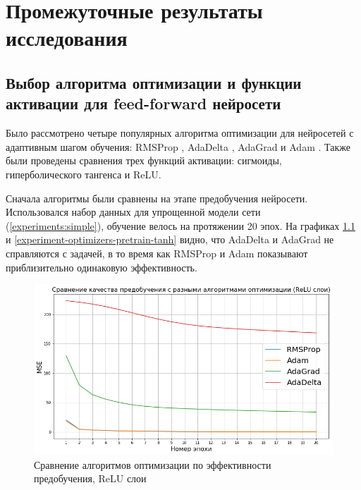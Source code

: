 \documentclass[specification, annotation]{itmo-student-thesis}
\begin{document}
\chapter{Промежуточные результаты исследования}

\section{Выбор алгоритма оптимизации и функции активации для feed-forward нейросети}\label{apx:optimizers}

Было рассмотрено четыре популярных алгоритма оптимизации для нейросетей с адаптивным
шагом обучения: RMSProp \cite{tieleman2012lecture},
AdaDelta \cite{zeiler2012adadelta}, AdaGrad \cite{duchi2011adaptive} и
Adam \cite{kingma2014adam}. Также были проведены сравнения трех функций
активации: сигмоиды, гиперболического тангенса и ReLU.

Сначала алгоритмы были сравнены на этапе предобучения нейросети. Использовался
набор данных для упрощенной модели сети (\ref{experiments:simple}), обучение
велось на протяжении 20 эпох. На графиках
\ref{experiment-optimizers-pretrain-relu} и
\ref{experiment-optimizers-pretrain-tanh} видно, что AdaDelta и AdaGrad не
справляются с задачей, в то время как RMSProp и Adam показывают приблизительно
одинаковую эффективность.

\begin{figure}[!h]
  \caption{Сравнение алгоритмов оптимизации по эффективности
    предобучения, ReLU слои}\label{experiment-optimizers-pretrain-relu}
  \centering
  \includegraphics[scale=0.6]{experiment-optimizers-pretrain-relu}
\end{figure}
\end{document}
